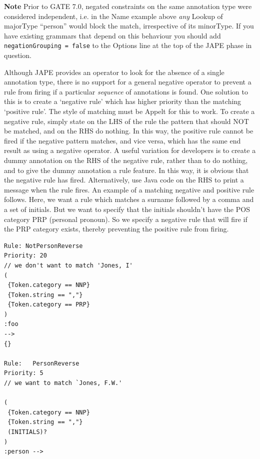 {\bf Note} Prior to GATE 7.0, negated constraints on the same annotation type
were considered independent, i.e. in the Name example above {\em any} Lookup of
majorType ``person'' would block the match, irrespective of its minorType.  If
you have existing grammars that depend on this behaviour you should add
\verb|negationGrouping = false| to the Options line at the top of the JAPE
phase in question.

Although JAPE provides an operator to look for the absence of a single annotation
type, there is no support for a general negative operator to prevent a rule from
firing if a particular \emph{sequence} of annotations is found. One solution to
this is to create a `negative rule' which has higher priority than the matching
`positive rule'. The style of matching must be Appelt for this to work. To create
a negative rule, simply state on the LHS of the rule the pattern that should NOT
be matched, and on the RHS do nothing. In this way, the positive rule cannot be
fired if the negative pattern matches, and vice versa, which has the same end
result as using a negative operator. A useful variation for developers is to
create a dummy annotation on the RHS of the negative rule, rather than to do
nothing, and to give the dummy annotation a rule feature. In this way, it is
obvious that the negative rule has fired. Alternatively, use Java code on the RHS
to print a message when the rule fires. An example of a matching negative and
positive rule follows. Here, we want a rule which matches a surname followed by a
comma and a set of initials. But we want to specify that the initials shouldn't
have the POS category PRP (personal pronoun). So we specify a negative rule that
will fire if the PRP category exists, thereby preventing the positive rule from
firing.
\begin{small}
\begin{verbatim}
Rule: NotPersonReverse
Priority: 20
// we don't want to match 'Jones, I'
(
 {Token.category == NNP}
 {Token.string == ","}
 {Token.category == PRP}
)
:foo
-->
{}

Rule:   PersonReverse
Priority: 5
// we want to match `Jones, F.W.'

(
 {Token.category == NNP}
 {Token.string == ","}
 (INITIALS)?
)
:person -->
\end{verbatim}
\end{small}
%


